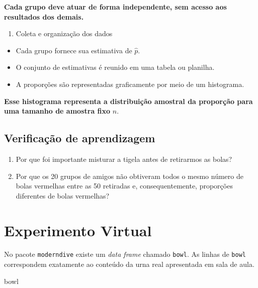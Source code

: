 \documentclass[
  letterpaper,
  DIV=11,
  numbers=noendperiod]{scrreprt}
\newenvironment{Shaded}{\begin{snugshade}}{\end{snugshade}}
\newcommand{\NormalTok}[1]{\textcolor[rgb]{0.00,0.23,0.31}{#1}}
\providecommand{\tightlist}{%
  \setlength{\itemsep}{0pt}\setlength{\parskip}{0pt}}\usepackage{longtable,booktabs,array}
\begin{document}
\textbf{Cada grupo deve atuar de forma independente, sem acesso aos
resultados dos demais.}

\begin{enumerate}
\def\labelenumi{\arabic{enumi}.}
\setcounter{enumi}{2}
\tightlist
\item
  Coleta e organização dos dados
\end{enumerate}

\begin{itemize}
\item
  Cada grupo fornece sua estimativa de \(\hat{p}\).
\item
  O conjunto de estimativas é reunido em uma tabela ou planilha.
\item
  A proporções são representadas graficamente por meio de um histograma.
\end{itemize}

\textbf{Esse histograma representa a distribuição amostral da proporção
para uma tamanho de amostra fixo} \(n\).

\subsection*{Verificação de
aprendizagem}\label{verificauxe7uxe3o-de-aprendizagem}

\begin{enumerate}
\def\labelenumi{\arabic{enumi}.}
\item
  Por que foi importante misturar a tigela antes de retirarmos as bolas?
\item
  Por que os 20 grupos de amigos não obtiveram todos o mesmo número de
  bolas vermelhas entre as 50 retiradas e, consequentemente, proporções
  diferentes de bolas vermelhas?
\end{enumerate}

\section{Experimento Virtual}\label{experimento-virtual}

No pacote \texttt{moderndive} existe um \emph{data frame} chamado
\texttt{bowl}. As linhas de \texttt{bowl} correspondem exatamente ao
conteúdo da urna real apresentada em sala de aula.

\begin{Shaded}
\begin{Highlighting}[]
\NormalTok{bowl}
\end{Highlighting}
\end{Shaded}
\end{document}
